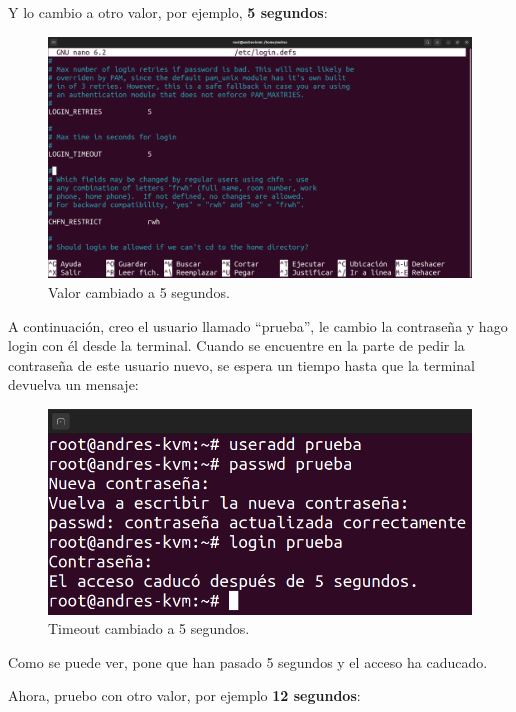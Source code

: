 \documentclass{article}
\begin{document}
\newpage

Y lo cambio a otro valor, por ejemplo, \textbf{5 segundos}:

\begin{figure}[H]
    \includegraphics[width=\textwidth]{imagenes/tout5.png}
    \caption{Valor cambiado a 5 segundos.}
\end{figure}


A continuación, creo el usuario llamado ``prueba'', le cambio la contraseña y hago login con él desde la terminal. Cuando se encuentre en la parte de pedir la contraseña de este usuario nuevo, se espera un tiempo hasta que la terminal devuelva un mensaje:

\begin{figure}[H]
    \includegraphics[width=\textwidth]{imagenes/tout5login.png}
    \caption{Timeout cambiado a 5 segundos.}
\end{figure}

Como se puede ver, pone que han pasado 5 segundos y el acceso ha caducado.

\newpage

Ahora, pruebo con otro valor, por ejemplo \textbf{12 segundos}:
\end{document}
